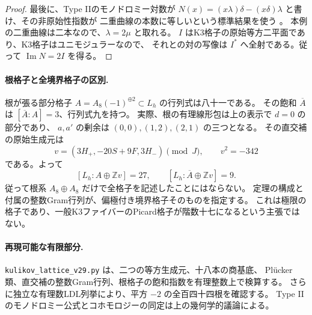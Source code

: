 \begin{proof}
最後に、Type IIのモノドロミー対数が
$N(x)=(x\lambda)\delta-(x\delta)\lambda$ と書け、その非原始性指数が
二重曲線の本数に等しいという標準結果を使う
\cite[Theorem 3.11]{AlexeevEngelHanAutomorphisms}。
本例の二重曲線は二本なので、$\lambda=2\mu$ と取れる。
$I$ はK3格子の原始等方二平面であり、K3格子はユニモジュラーなので、
それとの対の写像は $I^*$ へ全射である。従って $\operatorname{Im}N=2I$ を得る。
\end{proof}

\paragraph{根格子と全境界格子の区別.}
根が張る部分格子 $A=A_8(-1)^{\oplus2}\subset L_h$ の行列式は八十一である。
その飽和 $\overline A$ は $[\overline A:A]=3$、行列式九を持つ。
実際、根の有理線形包は上の表示で $d=0$ の部分であり、
$a,a'$ の剰余は $(0,0),(1,2),(2,1)$ の三つとなる。
その直交補の原始生成元は
\[
 v=(3H_+,-20S+9F,3H_-)\pmod J,\qquad v^2=-342
\]
である。よって
\[
 [L_h:A\oplus\mathbb Z v]=27,\qquad
 [L_h:\overline A\oplus\mathbb Z v]=9.
\]
従って根系 $A_8\oplus A_8$ だけで全格子を記述したことにはならない。
定理の構成と付属の整数Gram行列が、偏極付き境界格子そのものを指定する。
これは極限の格子であり、一般K3ファイバーのPicard格子が階数十七になるという主張ではない。

\paragraph{再現可能な有限部分.}
\nolinkurl{kulikov_lattice_v29.py} は、二つの等方生成元、十八本の商基底、
Pl\"ucker類、直交補の整数Gram行列、根格子の飽和指数を有理整数上で検算する。
さらに独立な有理数LDL列挙により、平方 $-2$ の全百四十四根を確認する。
Type IIのモノドロミー公式とコホモロジーの同定は上の幾何学的議論による。
